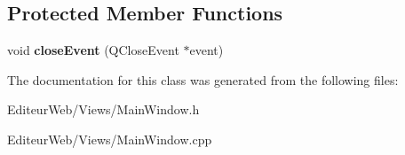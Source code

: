 \subsection*{Protected Member Functions}
\begin{DoxyCompactItemize}
\item 
\hypertarget{class_main_window_a4e20a4a065fbb0e4d3532a45a0a91425}{
void {\bfseries closeEvent} (QCloseEvent $\ast$event)}
\label{class_main_window_a4e20a4a065fbb0e4d3532a45a0a91425}

\end{DoxyCompactItemize}


The documentation for this class was generated from the following files:\begin{DoxyCompactItemize}
\item 
EditeurWeb/Views/MainWindow.h\item 
EditeurWeb/Views/MainWindow.cpp\end{DoxyCompactItemize}
